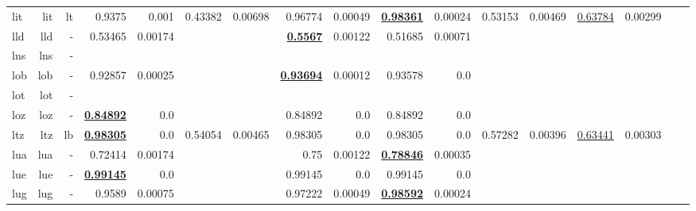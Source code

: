 \documentclass[11pt]{article}
\begin{document}
\begin{table*}[h]
{\begin{tabular}{lrrrrrrrrrrrrrrrr}
lit         & lit         & lt         & 0.9375         & 0.001         & 0.43382         & 0.00698         & 0.96774         & 0.00049         & \textbf{\underline{0.98361}}         & 0.00024         & 0.53153         & 0.00469         & \underline{0.63784}         & 0.00299         \\
lld         & lld         & -         & 0.53465         & 0.00174         &          &          & \textbf{\underline{0.5567}}         & 0.00122         & 0.51685         & 0.00071         &          &          &          &          \\
lns         & lns         & -         &          &          &          &          &          &          &          &          &          &          &          &          \\
lob         & lob         & -         & 0.92857         & 0.00025         &          &          & \textbf{\underline{0.93694}}         & 0.00012         & 0.93578         & 0.0         &          &          &          &          \\
lot         & lot         & -         &          &          &          &          &          &          &          &          &          &          &          &          \\
loz         & loz         & -         & \textbf{\underline{0.84892}}         & 0.0         &          &          & 0.84892         & 0.0         & 0.84892         & 0.0         &          &          &          &          \\
ltz         & ltz         & lb         & \textbf{\underline{0.98305}}         & 0.0         & 0.54054         & 0.00465         & 0.98305         & 0.0         & 0.98305         & 0.0         & 0.57282         & 0.00396         & \underline{0.63441}         & 0.00303         \\
lua         & lua         & -         & 0.72414         & 0.00174         &          &          & 0.75         & 0.00122         & \textbf{\underline{0.78846}}         & 0.00035         &          &          &          &          \\
lue         & lue         & -         & \textbf{\underline{0.99145}}         & 0.0         &          &          & 0.99145         & 0.0         & 0.99145         & 0.0         &          &          &          &          \\
lug         & lug         & -         & 0.9589         & 0.00075         &          &          & 0.97222         & 0.00049         & \textbf{\underline{0.98592}}         & 0.00024         &          &          &          &          \\

\end{tabular}}
\end{table*}
\end{document}
